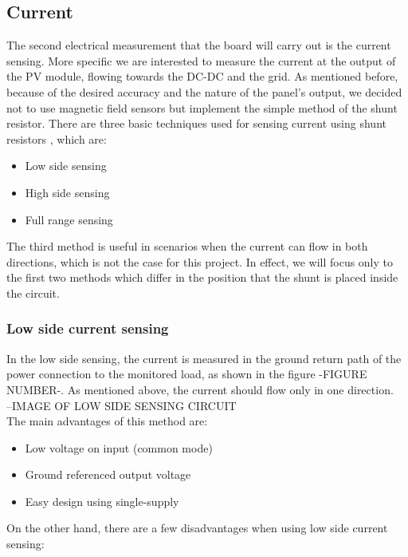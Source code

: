 \subsection{Current}
The second electrical measurement that the board will carry out is the current sensing. More specific we are interested to measure the current at the output of the PV module, flowing towards the DC-DC and the grid. As mentioned before, because of the desired accuracy and the nature of the panel's output, we decided not to use  magnetic field sensors but implement the simple method of the shunt resistor. There are three basic techniques used for sensing current using shunt resistors \cite{current_sense_Linear}, which are:

\begin{itemize}
    \item Low side sensing
    \item High side sensing
    \item Full range sensing
\end{itemize}

The third method is useful in scenarios when the current can flow in both directions, which is not the case for this project. In effect, we will focus only to the first two methods which differ in the position that the shunt is placed inside the circuit. 

\subsubsection{Low side current sensing}
In the low side sensing, the current is measured in the ground return path of the power connection to the monitored load, as shown in the figure -FIGURE NUMBER-. As mentioned above, the current should flow only in one direction.\\

--IMAGE OF LOW SIDE SENSING CIRCUIT\\

The main advantages of this method are:

\begin{itemize}
    \item Low voltage on input (common mode)
    \item Ground referenced output voltage
    \item Easy design using single-supply
\end{itemize}

On the other hand, there are a few disadvantages when using low side current sensing:

